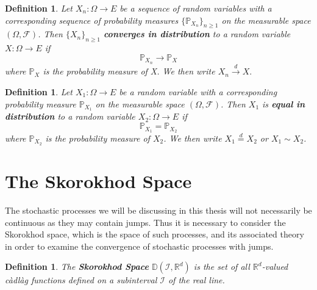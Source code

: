 \documentclass[honours,12pt]{unswthesis}
\newcommand{\R}{\mathbb{R}}
\newcommand{\PP}{\mathbb{P}}
\newcommand{\1}{\mathbf 1}
\newcommand{\FF}{\mathcal{F}}
\newcommand{\D}{\mathbb{D}}
\newtheorem{definition}[equation]{Definition}
\numberwithin{equation}{section}
\theoremstyle{definition}
\theoremstyle{remark}
\begin{document}
\begin{definition}
Let $X_n:\Omega\to E$ be a sequence of random variables with a corresponding sequence of probability measures $\{\PP_{X_n}\}_{n\geq 1}$ on the measurable space $(\Omega, \FF)$. Then $\{X_n\}_{n\geq 1}$ \textbf{converges in distribution} to a random variable $X:\Omega\to E$ if 
\[
\PP_{X_n} \to \PP_X
\] where $\PP_X$ is the probability measure of X. We then write $X_n \overset{d}{\to}X.$\\
\end{definition}

\begin{definition}\label{def:equalDist}
Let $X_1:\Omega\to E$ be a  random variable with a corresponding probability measure $\PP_{X_1}$ on the measurable space $(\Omega, \FF)$. Then $X_1$ is \textbf{equal in distribution} to a random variable $X_2:\Omega\to E$ if 
\[\PP_{X_1} = \PP_{X_2} \] where $\PP_{X_2}$ is the probability measure of $X_2$. We then write $X_1 \overset{d}{=}X_2$ or $X_1 \sim X_2$.\\
\end{definition}

\section{The Skorokhod Space}
The stochastic processes we will be discussing in this thesis will not necessarily be continuous as they may contain jumps. Thus it is necessary to consider the Skorokhod space, which is the space of such processes, and its associated theory in order to examine the convergence of stochastic processes with jumps.\\
\begin{definition}
	The \textbf{Skorokhod Space} $\D(\mathcal{I},\R^d)$ is the set of all $\R^d$-valued c\`{a}dl\`{a}g functions defined on a subinterval $\mathcal{I}$ of the real line.\\
\end{definition}
\end{document}
